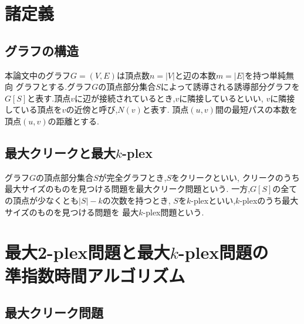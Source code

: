 \documentclass{thesis}
\theoremstyle{definition}
\begin{document}
\newpage

\chapter{諸定義}

\section{グラフの構造}
本論文中のグラフ$G=(V,E)$は頂点数$n=|V|$と辺の本数$m=|E|$を持つ単純無向
グラフとする.グラフ$G$の頂点部分集合$S$によって誘導される誘導部分グラフを
$G[S]$と表す.頂点$v$に辺が接続されているとき,$v$に隣接しているといい,
$v$に隣接している頂点を$v$の近傍と呼び,$N(v)$と表す.
頂点$(u,v)$間の最短パスの本数を頂点$(u,v)$の距離とする.

\section{最大クリークと最大$k$-plex}
グラフ$G$の頂点部分集合$S$が完全グラフとき,$S$をクリークといい,
クリークのうち最大サイズのものを見つける問題を最大クリーク問題という.
一方,$G[S]$の全ての頂点が少なくとも$|S| - k$の次数を持つとき,
$S$を$k$-plexといい,$k$-plexのうち最大サイズのものを見つける問題を
最大$k$-plex問題という.


\newpage

\chapter{最大2-plex問題と最大$k$-plex問題の \\ 準指数時間アルゴリズム}

\section{最大クリーク問題}
\end{document}
